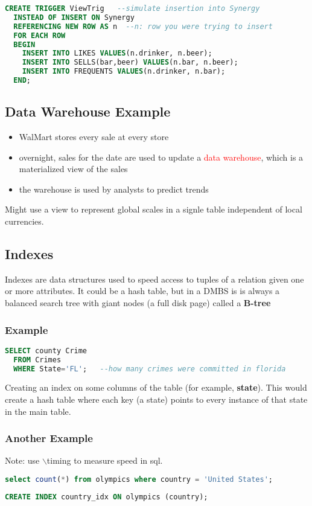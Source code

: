 \documentclass[12pt]{article}
\begin{document}
\begin{lstlisting}[language=sql, caption=view trigger]
  CREATE TRIGGER ViewTrig   --simulate insertion into Synergy
  INSTEAD OF INSERT ON Synergy
  REFERENCING NEW ROW AS n  --n: row you were trying to insert
  FOR EACH ROW
  BEGIN
    INSERT INTO LIKES VALUES(n.drinker, n.beer);
    INSERT INTO SELLS(bar,beer) VALUES(n.bar, n.beer);
    INSERT INTO FREQUENTS VALUES(n.drinker, n.bar);
  END;
\end{lstlisting}
\subsection{Data Warehouse Example}
\begin{itemize}
  \item WalMart stores every sale at every store
  \item overnight, sales for the date are used to update a
    \textcolor{red}{data warehouse}, which is a materialized view of the sales
  \item the warehouse is used by analysts to predict trends
\end{itemize}
Might use a view to represent global scales in a signle table independent of
local currencies.

\subsection{Indexes}
Indexes are data structures used to speed access to tuples of a relation given
one or more attributes.
It could be a hash table, but in a DMBS is is always a balanced search tree
with giant nodes (a full disk page) called a \textbf{B-tree}
\subsubsection{Example}
\begin{lstlisting}[language=sql, caption=a long computation]
  SELECT county Crime
  FROM Crimes
  WHERE State='FL';   --how many crimes were committed in florida
\end{lstlisting}
Creating an index on some columns of the table (for example, \textbf{state}).
This would create a hash table where each key (a state) points to every
instance of that state in the main table.

\subsubsection{Another Example}
Note: use $\backslash$timing to measure speed in sql.
\begin{lstlisting}[language=sql, caption=a long computation]
  select count(*) from olympics where country = 'United States';
\end{lstlisting}
\begin{lstlisting}[language=sql, caption=create index to speed count]
  CREATE INDEX country_idx ON olympics (country);
\end{lstlisting}
\end{document}

